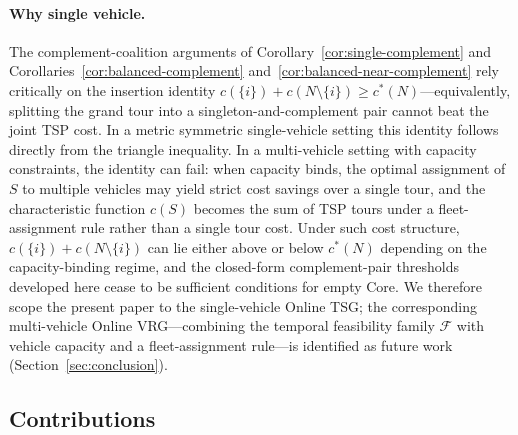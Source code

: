 \documentclass[11pt]{article}
\theoremstyle{plain}
\theoremstyle{definition}
\theoremstyle{remark}
\newcommand{\F}{\mathcal{F}}
\newcommand{\cstar}{c^{\ast}}
\begin{document}
\paragraph{Why single vehicle.} The complement-coalition arguments of Corollary~\ref{cor:single-complement} and Corollaries~\ref{cor:balanced-complement} and~\ref{cor:balanced-near-complement} rely critically on the insertion identity $c(\{i\}) + c(N\setminus\{i\}) \geq \cstar(N)$---equivalently, splitting the grand tour into a singleton-and-complement pair cannot beat the joint TSP cost. In a metric symmetric single-vehicle setting this identity follows directly from the triangle inequality. In a multi-vehicle setting with capacity constraints, the identity can fail: when capacity binds, the optimal assignment of $S$ to multiple vehicles may yield strict cost savings over a single tour, and the characteristic function $c(S)$ becomes the sum of TSP tours under a fleet-assignment rule rather than a single tour cost. Under such cost structure, $c(\{i\}) + c(N\setminus\{i\})$ can lie either above or below $\cstar(N)$ depending on the capacity-binding regime, and the closed-form complement-pair thresholds developed here cease to be sufficient conditions for empty Core. We therefore scope the present paper to the single-vehicle Online TSG; the corresponding multi-vehicle Online VRG---combining the temporal feasibility family $\F$ with vehicle capacity and a fleet-assignment rule---is identified as future work (Section~\ref{sec:conclusion}).

\subsection{Contributions}
\end{document}
